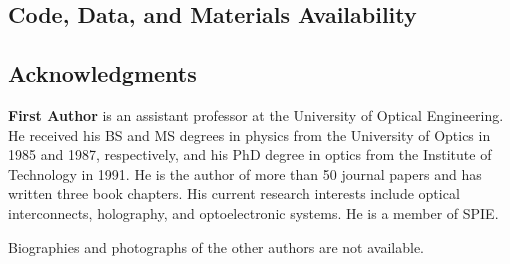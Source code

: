 \documentclass[12pt]{spieman}  %
\begin{document}
\subsection* {Code, Data, and Materials Availability} 


\subsection* {Acknowledgments}





\vspace{2ex}\noindent\textbf{First Author} is an assistant professor at the University of Optical Engineering. He received his BS and MS degrees in physics from the University of Optics in 1985 and 1987, respectively, and his PhD degree in optics from the Institute of Technology in 1991.  He is the author of more than 50 journal papers and has written three book chapters. His current research interests include optical interconnects, holography, and optoelectronic systems. He is a member of SPIE.

\vspace{1ex}
\noindent Biographies and photographs of the other authors are not available.

\listoffigures
\listoftables

\end{document}
